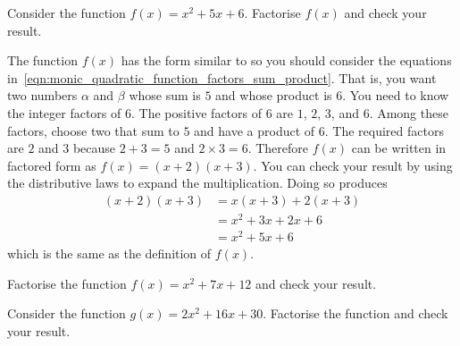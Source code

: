 \documentclass[a4paper,oneside,12pt]{article}
\begin{document}
\begin{example}
\label{eg:factorise_monic_a1_b2_c6}
Consider the function $f(x) = x^2 + 5x + 6$.  Factorise $f(x)$ and
check your result.
\end{example}

\begin{solution}
The function $f(x)$ has the form similar to
 so you should consider the
equations
in~\eqref{eqn:monic_quadratic_function_factors_sum_product}.  That is,
you want two numbers $\alpha$ and $\beta$ whose sum is $5$ and whose
product is $6$.  You need to know the integer factors of $6$.  The
positive factors of $6$ are $1$, $2$, $3$, and $6$.  Among these
factors, choose two that sum to $5$ and have a product of $6$.  The
required factors are $2$ and $3$ because $2 + 3 = 5$ and
$2 \times 3 = 6$.  Therefore $f(x)$ can be written in factored form as
$f(x) = (x + 2) (x + 3)$.  You can check your result by using the
distributive laws to expand the multiplication.  Doing so produces
\begin{align*}
(x + 2) (x + 3)
&=
x(x + 3) + 2(x + 3) \\[4pt]
&=
x^2 + 3x + 2x + 6 \\[4pt]
&=
x^2 + 5x + 6
\end{align*}
which is the same as the definition of $f(x)$.
\end{solution}

\begin{exercise}
Factorise the function $f(x) = x^2 + 7x + 12$ and check your result.
\end{exercise}


\begin{example}
Consider the function $g(x) = 2x^2 + 16x + 30$.  Factorise the
function and check your result.
\end{example}
\end{document}
